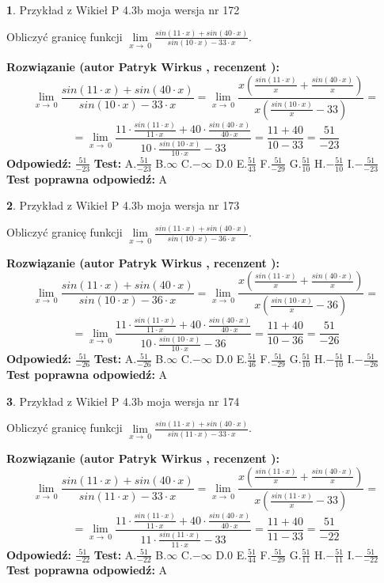 \documentclass[12pt, a4paper]{article}
\theoremstyle{definition} %
\newtheorem{zad}{}
\newcommand{\zadStart}[1]{\begin{zad}#1\newline}
\newcommand{\zadStop}{\end{zad}}
\newcommand{\rozwStart}[2]{\noindent \textbf{Rozwiązanie (autor #1 , recenzent #2): }\newline}
\newcommand{\rozwStop}{\newline}
\newcommand{\odpStart}{\noindent \textbf{Odpowiedź:}\newline}
\newcommand{\odpStop}{\newline}
\newcommand{\testStart}{\noindent \textbf{Test:}\newline}
\newcommand{\testStop}{\newline}
\newcommand{\kluczStart}{\noindent \textbf{Test poprawna odpowiedź:}\newline}
\newcommand{\kluczStop}{\newline}
\begin{document}
\zadStart{Przykład z Wikieł P 4.3b moja wersja nr 172}


Obliczyć granicę funkcji $\lim\limits_{x\to\ 0}\frac{sin(11 \cdot x)+sin(40 \cdot x)}{sin(10 \cdot x)-33 \cdot x}$.
\zadStop
\rozwStart{Patryk Wirkus}{}
$$\lim\limits_{x\to\ 0}\frac{sin(11 \cdot x)+sin(40 \cdot x)}{sin(10 \cdot x)-33 \cdot x}=\lim\limits_{x\to\ 0}\frac{x(\frac{sin(11 \cdot x)}{x}+\frac{sin(40 \cdot x)}{x})}{x(\frac{sin(10 \cdot x)}{x}-33)}=$$
$$=\lim\limits_{x\to\ 0}\frac{11 \cdot \frac{sin(11 \cdot x)}{11 \cdot x}+40 \cdot \frac{sin(40 \cdot x)}{40 \cdot x}}{10 \cdot \frac{sin(10 \cdot x)}{10 \cdot x}-33}=\frac{11+40}{10-33} = \frac{51}{-23}$$
\rozwStop
\odpStart
$\frac{51}{-23}$
\odpStop
\testStart
A.$\frac{51}{-23}$
B.$\infty$
C.$-\infty$
D.$0$
E.$\frac{51}{43}$
F.$\frac{51}{-29}$
G.$\frac{51}{10}$
H.$-\frac{51}{10}$
I.$-\frac{51}{-23}$
\testStop
\kluczStart
A
\kluczStop



\zadStart{Przykład z Wikieł P 4.3b moja wersja nr 173}


Obliczyć granicę funkcji $\lim\limits_{x\to\ 0}\frac{sin(11 \cdot x)+sin(40 \cdot x)}{sin(10 \cdot x)-36 \cdot x}$.
\zadStop
\rozwStart{Patryk Wirkus}{}
$$\lim\limits_{x\to\ 0}\frac{sin(11 \cdot x)+sin(40 \cdot x)}{sin(10 \cdot x)-36 \cdot x}=\lim\limits_{x\to\ 0}\frac{x(\frac{sin(11 \cdot x)}{x}+\frac{sin(40 \cdot x)}{x})}{x(\frac{sin(10 \cdot x)}{x}-36)}=$$
$$=\lim\limits_{x\to\ 0}\frac{11 \cdot \frac{sin(11 \cdot x)}{11 \cdot x}+40 \cdot \frac{sin(40 \cdot x)}{40 \cdot x}}{10 \cdot \frac{sin(10 \cdot x)}{10 \cdot x}-36}=\frac{11+40}{10-36} = \frac{51}{-26}$$
\rozwStop
\odpStart
$\frac{51}{-26}$
\odpStop
\testStart
A.$\frac{51}{-26}$
B.$\infty$
C.$-\infty$
D.$0$
E.$\frac{51}{46}$
F.$\frac{51}{-29}$
G.$\frac{51}{10}$
H.$-\frac{51}{10}$
I.$-\frac{51}{-26}$
\testStop
\kluczStart
A
\kluczStop



\zadStart{Przykład z Wikieł P 4.3b moja wersja nr 174}


Obliczyć granicę funkcji $\lim\limits_{x\to\ 0}\frac{sin(11 \cdot x)+sin(40 \cdot x)}{sin(11 \cdot x)-33 \cdot x}$.
\zadStop
\rozwStart{Patryk Wirkus}{}
$$\lim\limits_{x\to\ 0}\frac{sin(11 \cdot x)+sin(40 \cdot x)}{sin(11 \cdot x)-33 \cdot x}=\lim\limits_{x\to\ 0}\frac{x(\frac{sin(11 \cdot x)}{x}+\frac{sin(40 \cdot x)}{x})}{x(\frac{sin(11 \cdot x)}{x}-33)}=$$
$$=\lim\limits_{x\to\ 0}\frac{11 \cdot \frac{sin(11 \cdot x)}{11 \cdot x}+40 \cdot \frac{sin(40 \cdot x)}{40 \cdot x}}{11 \cdot \frac{sin(11 \cdot x)}{11 \cdot x}-33}=\frac{11+40}{11-33} = \frac{51}{-22}$$
\rozwStop
\odpStart
$\frac{51}{-22}$
\odpStop
\testStart
A.$\frac{51}{-22}$
B.$\infty$
C.$-\infty$
D.$0$
E.$\frac{51}{44}$
F.$\frac{51}{-29}$
G.$\frac{51}{11}$
H.$-\frac{51}{11}$
I.$-\frac{51}{-22}$
\testStop
\kluczStart
A
\kluczStop
\end{document}
